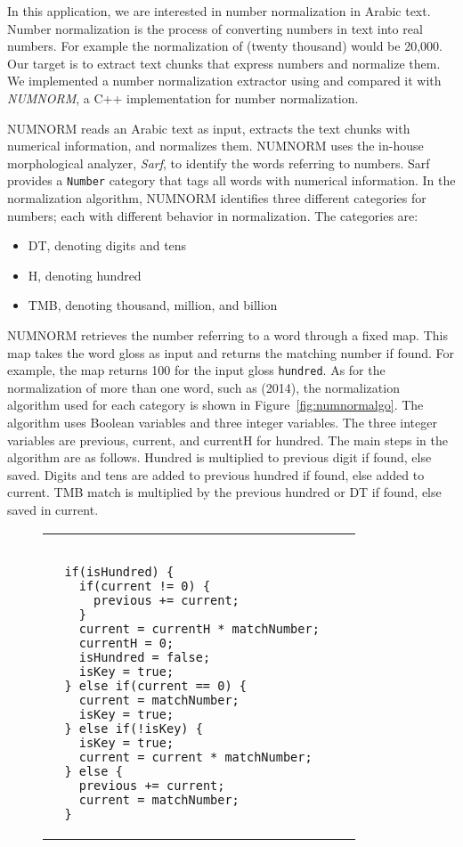 \begin{appendices}
In this application, we are interested in number normalization in Arabic text. 
Number normalization is the process of converting numbers in text into real numbers. 
For example the normalization of  (twenty thousand) would be 20,000. 
Our target is to extract text chunks that express numbers and normalize them. 
We implemented a number normalization extractor using \framework and 
compared it with {\em NUMNORM}, a 
C++ implementation for number normalization.

NUMNORM reads an Arabic text as input, extracts the text chunks with numerical information, and normalizes them. 
NUMNORM uses the in-house morphological analyzer, {\em Sarf}, to identify the words referring to numbers. 
Sarf provides a {\tt Number} category that tags all words with numerical information. 
In the normalization algorithm, NUMNORM identifies three different categories for numbers;
each with different behavior in normalization. 
The categories are:
\begin{itemize}
\item DT, denoting digits and tens
\item H, denoting hundred
\item TMB, denoting thousand, million, and billion
\end{itemize}

NUMNORM retrieves the number referring to a word through a fixed map. 
This map takes the word gloss as input and returns the matching number if found. 
For example, the map returns 100 for the input gloss {\tt hundred}. 
As for the normalization of more than one word, such as  (2014), 
the normalization algorithm used for each category is shown in Figure~\ref{fig:numnormalgo}.  
The algorithm uses Boolean variables and three integer variables. 
The three integer variables are previous, current, and currentH for hundred. 
The main steps in the algorithm are as follows. 
Hundred is multiplied to previous digit if found, else saved. 
Digits and tens are added to previous hundred if found, else added to current. 
TMB match is multiplied by the previous hundred or DT if found, 
else saved in current.

\begin{figure}[tb!]
\centering
  \begin{tabular}{p{3.6cm}p{3.6cm}p{3.6cm}}
\begin{Verbatim}[fontsize=\relsize{-3},frame=single,label=TMB algorithm] 

  if(isHundred) {
    if(current != 0) {
      previous += current;
    }
    current = currentH * matchNumber;
    currentH = 0;
    isHundred = false;
    isKey = true;
  } else if(current == 0) {
    current = matchNumber;
    isKey = true;
  } else if(!isKey) {
    isKey = true;
    current = current * matchNumber;
  } else {
    previous += current;
    current = matchNumber;
  }
\end{Verbatim}
&
\begin{Verbatim}[fontsize=\relsize{-3},frame=single,label=DT algorithm] 


\end{Verbatim}
\end{tabular}
\end{figure}
\end{appendices}
